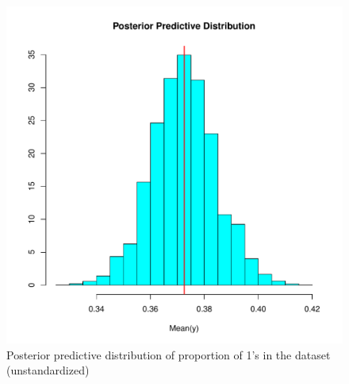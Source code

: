 \documentclass[11pt]{article}
\begin{document}
\begin{itemize}
 \begin{figure}[h]
 \begin{center}
  \includegraphics[scale=0.5]{bc_ppc.pdf}
  \caption{Posterior predictive distribution of proportion of 1's in the dataset (unstandardized)}\label{ppc}
 \end{center}
 \end{figure}
 
 
\end{itemize}
\end{document}
